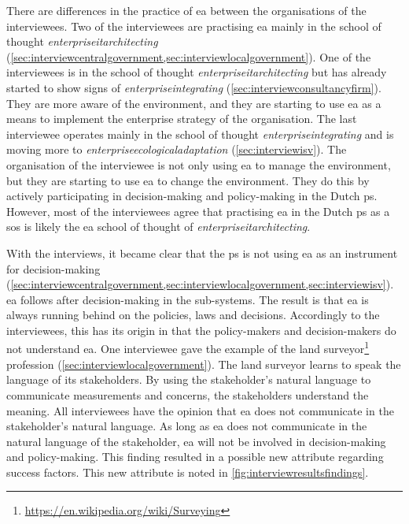 There are differences in the practice of \gls{ea} between the organisations of the interviewees. Two of the interviewees are practising \gls{ea} mainly in the school of thought \textit{\gls{enterpriseitarchitecting}} (\cref{sec:interviewcentralgovernment,sec:interviewlocalgovernment}). One of the interviewees is in the school of thought \textit{\gls{enterpriseitarchitecting}} but has already started to show signs of \textit{\gls{enterpriseintegrating}} (\cref{sec:interviewconsultancyfirm}). They are more aware of the environment, and they are starting to use \gls{ea} as a means to implement the enterprise strategy of the organisation. The last interviewee operates mainly in the school of thought \textit{\gls{enterpriseintegrating}} and is moving more to \textit{\gls{enterpriseecologicaladaptation}} (\cref{sec:interviewisv}). The organisation of the interviewee is not only using \gls{ea} to manage the environment, but they are starting to use \gls{ea} to change the environment. They do this by actively participating in decision-making and policy-making in the Dutch \gls{ps}. However, most of the interviewees agree that practising \gls{ea} in the Dutch \gls{ps} as a \acrlong{sos} is likely the \gls{ea} school of thought of \textit{\gls{enterpriseitarchitecting}}.

With the interviews, it became clear that the \gls{ps} is not using \gls{ea} as an instrument for decision-making (\cref{sec:interviewcentralgovernment,sec:interviewlocalgovernment,sec:interviewisv}). \gls{ea} follows after decision-making in the sub-systems. The result is that \gls{ea} is always running behind on the policies, laws and decisions. Accordingly to the interviewees, this has its origin in that the policy-makers and decision-makers do not understand \gls{ea}. One interviewee gave the example of the land surveyor\footnote{\url{https://en.wikipedia.org/wiki/Surveying}} profession (\cref{sec:interviewlocalgovernment}). The land surveyor learns to speak the language of its stakeholders. By using the stakeholder's natural language to communicate measurements and concerns, the stakeholders understand the meaning. All interviewees have the opinion that \gls{ea} does not communicate in the stakeholder's natural language. As long as \gls{ea} does not communicate in the natural language of the stakeholder, \gls{ea} will not be involved in decision-making and policy-making. This finding resulted in a possible new \gls{attribute} regarding success factors. This new \gls{attribute} is noted in \cref{fig:interviewresultsfindings}.
